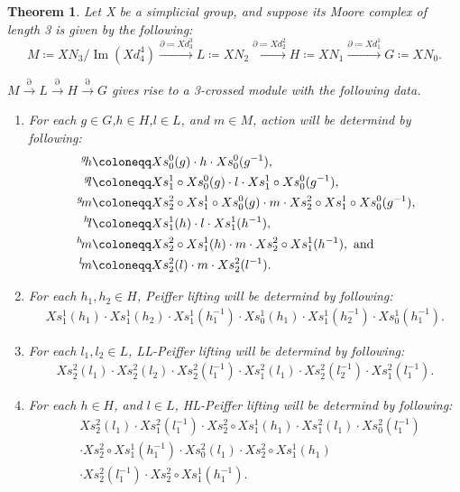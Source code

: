 \documentclass{tac}
\newtheorem{theorem}{Theorem}
\newcommand{\act}[1]{\,\sp{#1}\!}
\begin{document}
\begin{theorem}
 Let X be a simplicial group, and suppose its Moore complex of length 3 is given by the following:
 \[
 M\coloneqq XN_3/{\operatorname{Im} (Xd^4_4)} \xrightarrow{\partial \coloneqq Xd^3_3} L\coloneqq XN_2  \xrightarrow{\partial \coloneqq Xd^2_2} H\coloneqq XN_1 \xrightarrow{\partial \coloneqq Xd^1_1}  G \coloneqq XN_0.
 \]

 
$M \xrightarrow{\partial} L \xrightarrow{\partial} H \xrightarrow{\partial} G$ gives rise to a 3-crossed module with the following data.

\begin{enumerate}[label=(\roman*)]

\item For each $g \in G$,$h \in H$,$l \in L$, and $m \in M$, action will be determind by following:
\begin{align*}
\act{g}h&\coloneqq Xs^0_0(g)\cdot h\cdot Xs^0_0(g^{-1}) ,\\
\act{g}l &\coloneqq   Xs^1_1\circ Xs^0_0(g)\cdot l\cdot Xs^1_1\circ Xs^0_0(g^{-1}),\\
\act{g}m& \coloneqq  Xs^2_2\circ Xs^1_1\circ Xs^0_0(g)\cdot m\cdot Xs^2_2\circ Xs^1_1\circ Xs^0_0(g^{-1}), \\
\act{h}l &\coloneqq  Xs^1_1(h)\cdot l\cdot Xs^1_1(h^{-1}),\\
\act{h}m& \coloneqq  Xs^2_2\circ Xs^1_1(h)\cdot m\cdot Xs^2_2\circ Xs^1_1(h^{-1}), \text{ and}\\
\act{l}m &\coloneqq  Xs^2_2(l)\cdot m\cdot Xs^2_2(l^{-1}).\\
\end{align*}

\item For each $h_1, h_2 \in H$, Peiffer lifting will be determind by following:
\begin{align*}
Xs_1^1(h_1)\cdot Xs_1^1(h_2)\cdot Xs_1^1(h_1^{-1})\cdot Xs_0^1(h_1)\cdot Xs_1^1(h_2^{-1})\cdot Xs_0^1(h_1^{-1}).
\end{align*}

\item For each $l_1, l_2 \in L$, LL-Peiffer lifting will be determind by following:
\begin{align*}
Xs_2^2(l_1)\cdot Xs_2^2(l_2)\cdot Xs_2^2(l_1^{-1})\cdot Xs_1^2(l_1)\cdot Xs_2^2(l_2^{-1})\cdot Xs_1^2(l_1^{-1}).
\end{align*}

\item For each $h \in H$, and $l \in L$, HL-Peiffer lifting will be determind by following:
\begin{align*}
&Xs_2^2(l_1)\cdot Xs_1^2(l_1^{-1})\cdot Xs_2^2\circ Xs_1^1(h_1)\cdot Xs_1^2(l_1)\cdot Xs_0^2(l_1^{-1})\\
&\cdot Xs_2^2\circ Xs_1^1(h_1^{-1})\cdot Xs_0^2(l_1)\cdot Xs_2^2\circ Xs_1^1(h_1)\\
&\cdot Xs_2^2(l_1^{-1})\cdot Xs_2^2\circ Xs_1^1(h_1^{-1}).
\end{align*}


\end{enumerate}
\end{theorem}
\end{document}
